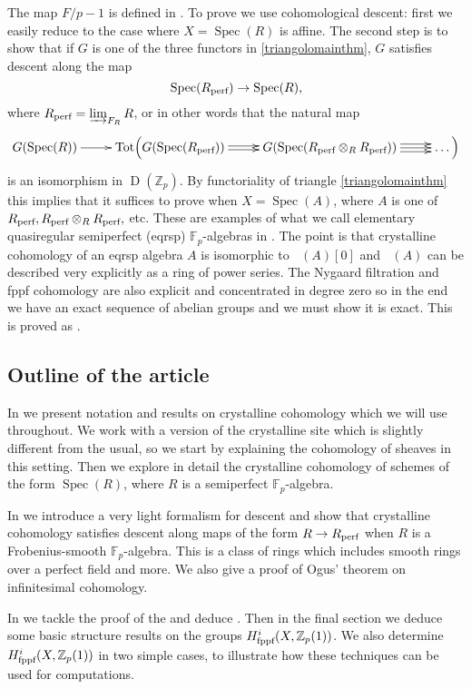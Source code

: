 \documentclass[11pt]{article}
\theoremstyle{plain}
\theoremstyle{definition}
\theoremstyle{remark}
\numberwithin{equation}{section}
\newcommand{\Fp}{\mathbb{F}_p}
\newcommand{\Zp}{\mathbb{Z}_p}
\DeclareMathOperator{\D}{D}                                              %
\DeclareMathOperator{\Tot}{Tot}                                          %
\DeclareMathOperator{\Spec}{Spec}                                        %
\newcommand\Hflat[1]{H^{#1}_{\textnormal{fppf}}}                         %
\DeclareMathOperator{\Acr}{\mathbb{A}_{cris}}                            %
\newcommand\coperf[1]{#1_{\textnormal{perf}}}                            %
\begin{document}
The map $F/p-1$ is defined in . To prove  we use cohomological descent: first we easily reduce to the case where $X=\Spec(R)$ is affine. The second step is to show that if $G$ is one of the three functors in \eqref{triangolomainthm}, $G$ satisfies descent along the map 
\[
\Spec(\coperf{R})\to\Spec(R),
\]
where $\coperf{R}=\varinjlim_{F_R}R$, or in other words that the natural map
\[
\xymatrix{G(\Spec(R))\ar[r]&\Tot\Bigl(G(\Spec(\coperf{R}))\ar[r]<1.5pt>\ar[r]<-1.5pt> & G(\Spec(\coperf{R}\otimes_R\coperf{R}))\ar[r]\ar[r]<-3pt>\ar[r]<3pt> & \dots\Bigr)}
\]
is an isomorphism in $\D(\Zp)$. By functoriality of triangle \eqref{triangolomainthm} this implies that it suffices to prove  when $X=\Spec(A)$, where $A$ is one of $\coperf{R},\coperf{R}\otimes_R\coperf{R},$ etc. These are examples of what we call elementary quasiregular semiperfect (eqrsp) $\Fp$-algebras in . The point is that crystalline cohomology of an eqrsp algebra $A$ is isomorphic to $\Acr(A)[0]$ and $\Acr(A)$ can be described very explicitly as a ring of power series. The Nygaard filtration and fppf cohomology are also explicit and concentrated in degree zero so in the end we have an exact sequence of abelian groups and we must show it is exact. This is proved as .

\subsection*{Outline of the article}

In  we present notation and results on crystalline cohomology which we will use throughout. We work with a version of the crystalline site which is slightly different from the usual, so we start by explaining the cohomology of sheaves in this setting. Then we explore in detail the crystalline cohomology of schemes of the form $\Spec(R)$, where $R$ is a semiperfect $\Fp$-algebra. 

In  we introduce a very light formalism for descent and show that crystalline cohomology satisfies descent along maps of the form $R\to\coperf{R}$ when $R$ is a Frobenius-smooth $\Fp$-algebra. This is a class of rings which includes smooth rings over a perfect field and more. We also give a proof of Ogus' theorem on infinitesimal cohomology.

In  we tackle the proof of the  and deduce . Then in the final section we deduce some basic structure results on the groups $\Hflat{i}(X,\Zp(1))$. We also determine $\Hflat{i}(X,\Zp(1))$ in two simple cases, to illustrate how these techniques can be used for computations. 
\end{document}
